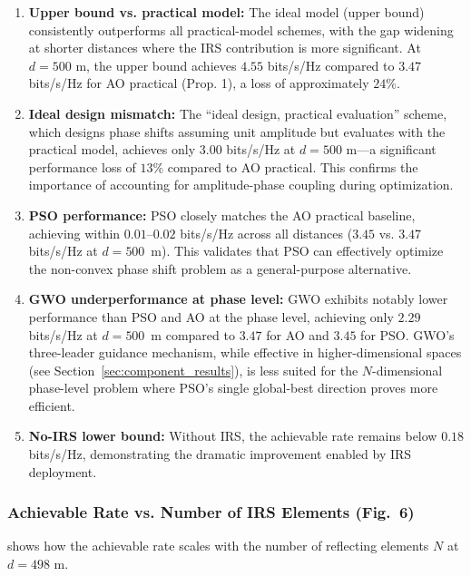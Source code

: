\documentclass[12pt,a4paper]{article}
\begin{document}
\begin{enumerate}
    \item \textbf{Upper bound vs. practical model:} The ideal model (upper bound) consistently outperforms all practical-model schemes, with the gap widening at shorter distances where the IRS contribution is more significant. At $d = 500$ m, the upper bound achieves $4.55$ bits/s/Hz compared to $3.47$ bits/s/Hz for AO practical (Prop. 1), a loss of approximately $24\%$.

    \item \textbf{Ideal design mismatch:} The ``ideal design, practical evaluation'' scheme, which designs phase shifts assuming unit amplitude but evaluates with the practical model, achieves only $3.00$ bits/s/Hz at $d = 500$ m---a significant performance loss of $13\%$ compared to AO practical. This confirms the importance of accounting for amplitude-phase coupling during optimization.

    \item \textbf{PSO performance:} PSO closely matches the AO practical baseline, achieving within $0.01$--$0.02$ bits/s/Hz across all distances ($3.45$ vs. $3.47$ bits/s/Hz at $d = 500$~m). This validates that PSO can effectively optimize the non-convex phase shift problem as a general-purpose alternative.

    \item \textbf{GWO underperformance at phase level:} GWO exhibits notably lower performance than PSO and AO at the phase level, achieving only $2.29$ bits/s/Hz at $d = 500$~m compared to $3.47$ for AO and $3.45$ for PSO. GWO's three-leader guidance mechanism, while effective in higher-dimensional spaces (see Section~\ref{sec:component_results}), is less suited for the $N$-dimensional phase-level problem where PSO's single global-best direction proves more efficient.

    \item \textbf{No-IRS lower bound:} Without IRS, the achievable rate remains below $0.18$ bits/s/Hz, demonstrating the dramatic improvement enabled by IRS deployment.
\end{enumerate}

\subsubsection{Achievable Rate vs. Number of IRS Elements (Fig.~6)}

 shows how the achievable rate scales with the number of reflecting elements $N$ at $d = 498$ m.
\end{document}
